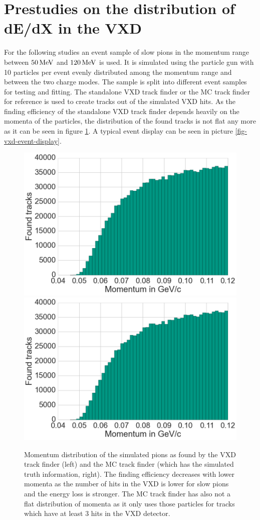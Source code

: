 \section{Prestudies on the distribution of dE/dX in the VXD}

For the following studies an event sample of slow pions in the momentum range between $\unit[50]{MeV}$ and $\unit[120]{MeV}$ is used. It is simulated using the particle gun with 10 particles per event evenly distributed among the momentum range and between the two charge modes. The sample is split into different event samples for testing and fitting. The standalone VXD track finder or the MC track finder for reference is used to create tracks out of the simulated VXD hits. As the finding efficiency of the standalone VXD track finder depends heavily on the momenta of the particles, the distribution of the found tracks is not flat any more as it can be seen in figure \ref{fig-vxd-finding-efficiency}. A typical event display can be seen in picture \ref{fig-vxd-event-display}.

\begin{figure}
 \centering
 \includegraphics[width=0.48\linewidth]{figures/vxd/finding_efficiency.png}
 \includegraphics[width=0.48\linewidth]{figures/vxd/finding_efficiency.png}
 \caption{Momentum distribution of the simulated pions as found by the VXD track finder (left) and the MC track finder (which has the simulated truth information, right). The finding efficiency decreases with lower momenta as the number of hits in the VXD is lower for slow pions and the energy loss is stronger. The MC track finder has also not a flat distribution of momenta as it only uses those particles for tracks which have at least 3 hits in the VXD detector.}
 \label{fig-vxd-finding-efficiency}
\end{figure}

